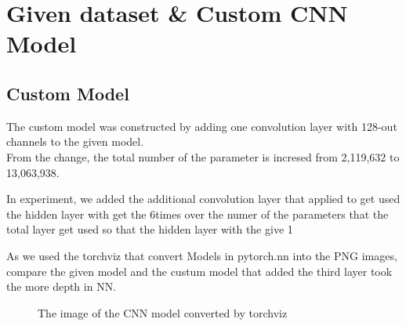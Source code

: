 \section{Given dataset \& Custom CNN Model}
\subsection{Custom Model}
The custom model was constructed by adding one convolution layer with 128-out channels to the given model.\\
From the change, the total number of the parameter is incresed from 2,119,632 to 13,063,938.

In experiment, we added the additional convolution layer that applied to get used the hidden layer with get the 6times over the numer of the parameters that the total layer get used 
so that the hidden layer with the give  1

As we used the torchviz that convert Models in pytorch.nn into the PNG images, compare the given model and the custum model that added the third layer took the more depth in NN.
\begin{figure}[h!]
\centering
{}
\caption{The image of the CNN model converted by torchviz }
\end{figure}

